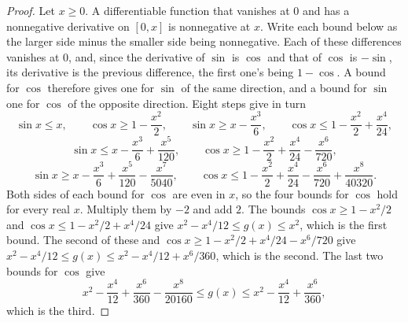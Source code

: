 \begin{proof}
Let $x \ge 0$. A differentiable function that vanishes at $0$ and has a nonnegative derivative on
$[0, x]$ is nonnegative at $x$. Write each bound below as the larger side minus the smaller side
being nonnegative. Each of these differences vanishes at $0$, and, since the derivative of $\sin$ is
$\cos$ and that of $\cos$ is $-\sin$, its derivative is the previous difference, the first one's
being $1 - \cos$. A bound for $\cos$ therefore gives one for $\sin$ of the same direction, and a
bound for $\sin$ one for $\cos$ of the opposite direction. Eight steps give in turn
\[
  \sin x \le x, \qquad \cos x \ge 1 - \frac{x^2}{2}, \qquad \sin x \ge x - \frac{x^3}{6}, \qquad
  \cos x \le 1 - \frac{x^2}{2} + \frac{x^4}{24},
\]
\[
  \sin x \le x - \frac{x^3}{6} + \frac{x^5}{120}, \qquad
  \cos x \ge 1 - \frac{x^2}{2} + \frac{x^4}{24} - \frac{x^6}{720},
\]
\[
  \sin x \ge x - \frac{x^3}{6} + \frac{x^5}{120} - \frac{x^7}{5040}, \qquad
  \cos x \le 1 - \frac{x^2}{2} + \frac{x^4}{24} - \frac{x^6}{720} + \frac{x^8}{40320} .
\]
Both sides of each bound for $\cos$ are even in $x$, so the four bounds for $\cos$ hold for every
real $x$. Multiply them by $-2$ and add $2$. The bounds $\cos x \ge 1 - x^2/2$ and
$\cos x \le 1 - x^2/2 + x^4/24$ give $x^2 - x^4/12 \le g(x) \le x^2$, which is the first bound. The
second of these and $\cos x \ge 1 - x^2/2 + x^4/24 - x^6/720$ give
$x^2 - x^4/12 \le g(x) \le x^2 - x^4/12 + x^6/360$, which is the second. The last two bounds for
$\cos$ give
\[
  x^2 - \frac{x^4}{12} + \frac{x^6}{360} - \frac{x^8}{20160} \le g(x)
  \le x^2 - \frac{x^4}{12} + \frac{x^6}{360} ,
\]
which is the third.
\end{proof}


